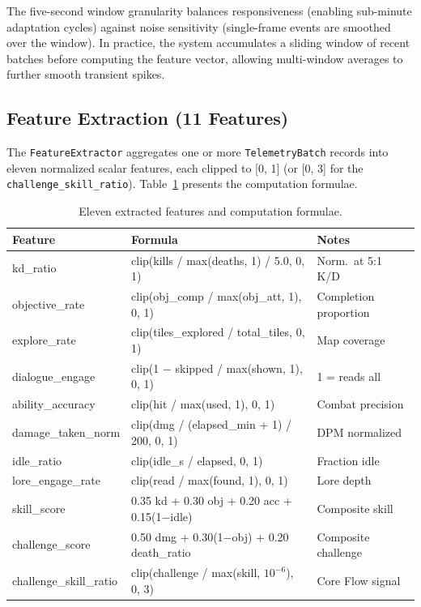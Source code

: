 \documentclass[12pt,a4paper]{report}
\begin{document}
The five-second window granularity balances responsiveness (enabling sub-minute adaptation cycles) against noise sensitivity (single-frame events are smoothed over the window). In practice, the system accumulates a sliding window of recent batches before computing the feature vector, allowing multi-window averages to further smooth transient spikes.

\subsection{Feature Extraction (11 Features)}

The \texttt{FeatureExtractor} aggregates one or more \texttt{TelemetryBatch} records into eleven normalized scalar features, each clipped to [0, 1] (or [0, 3] for the \texttt{challenge\_skill\_ratio}). Table~\ref{tab:features} presents the computation formulae.

\begin{table}[H]
\centering
\caption{Eleven extracted features and computation formulae.}
\label{tab:features}
\small
\begin{tabular}{@{}p{3.5cm} p{6cm} p{3.5cm}@{}}
\toprule
\textbf{Feature} & \textbf{Formula} & \textbf{Notes} \\
\midrule
kd\_ratio & clip(kills / max(deaths, 1) / 5.0, 0, 1) & Norm.\ at 5:1 K/D \\
objective\_rate & clip(obj\_comp / max(obj\_att, 1), 0, 1) & Completion proportion \\
explore\_rate & clip(tiles\_explored / total\_tiles, 0, 1) & Map coverage \\
dialogue\_engage & clip(1 $-$ skipped / max(shown, 1), 0, 1) & 1 = reads all \\
ability\_accuracy & clip(hit / max(used, 1), 0, 1) & Combat precision \\
damage\_taken\_norm & clip(dmg / (elapsed\_min + 1) / 200, 0, 1) & DPM normalized \\
idle\_ratio & clip(idle\_s / elapsed, 0, 1) & Fraction idle \\
lore\_engage\_rate & clip(read / max(found, 1), 0, 1) & Lore depth \\
skill\_score & 0.35 kd + 0.30 obj + 0.20 acc + 0.15(1$-$idle) & Composite skill \\
challenge\_score & 0.50 dmg + 0.30(1$-$obj) + 0.20 death\_ratio & Composite challenge \\
challenge\_skill\_ratio & clip(challenge / max(skill, $10^{-6}$), 0, 3) & Core Flow signal \\
\bottomrule
\end{tabular}
\end{table}
\end{document}
